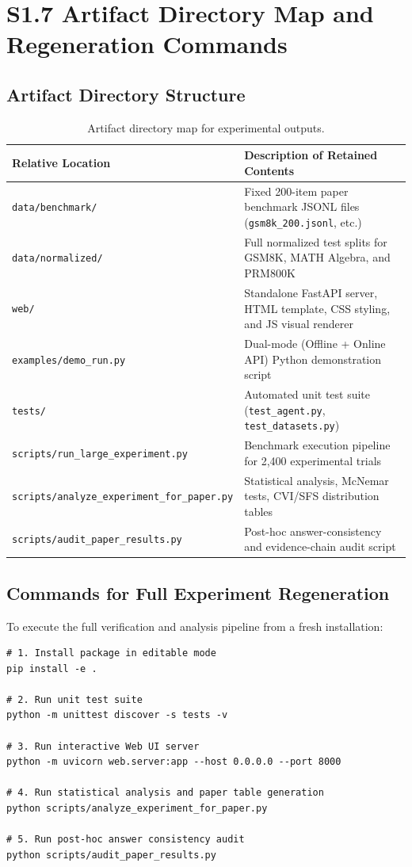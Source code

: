 \documentclass[11pt,letterpaper]{article}
\begin{document}
\section{S1.7 Artifact Directory Map and Regeneration Commands}\label{sec:s17-artifact-map}

\subsection{Artifact Directory Structure}
\begin{table}[htbp]
\centering
\small
\caption{Artifact directory map for experimental outputs.}
\label{tab:s1-artifact-directory-map}
\begin{tabular}{ll}
\toprule
Relative Location & Description of Retained Contents \\
\midrule
\texttt{data/benchmark/} & Fixed 200-item paper benchmark JSONL files (\texttt{gsm8k\_200.jsonl}, etc.) \\
\texttt{data/normalized/} & Full normalized test splits for GSM8K, MATH Algebra, and PRM800K \\
\texttt{web/} & Standalone FastAPI server, HTML template, CSS styling, and JS visual renderer \\
\texttt{examples/demo\_run.py} & Dual-mode (Offline + Online API) Python demonstration script \\
\texttt{tests/} & Automated unit test suite (\texttt{test\_agent.py}, \texttt{test\_datasets.py}) \\
\texttt{scripts/run\_large\_experiment.py} & Benchmark execution pipeline for 2,400 experimental trials \\
\texttt{scripts/analyze\_experiment\_for\_paper.py} & Statistical analysis, McNemar tests, CVI/SFS distribution tables \\
\texttt{scripts/audit\_paper\_results.py} & Post-hoc answer-consistency and evidence-chain audit script \\
\bottomrule
\end{tabular}
\end{table}

\subsection{Commands for Full Experiment Regeneration}
To execute the full verification and analysis pipeline from a fresh installation:

\begin{verbatim}
# 1. Install package in editable mode
pip install -e .

# 2. Run unit test suite
python -m unittest discover -s tests -v

# 3. Run interactive Web UI server
python -m uvicorn web.server:app --host 0.0.0.0 --port 8000

# 4. Run statistical analysis and paper table generation
python scripts/analyze_experiment_for_paper.py

# 5. Run post-hoc answer consistency audit
python scripts/audit_paper_results.py
\end{verbatim}
\end{document}

